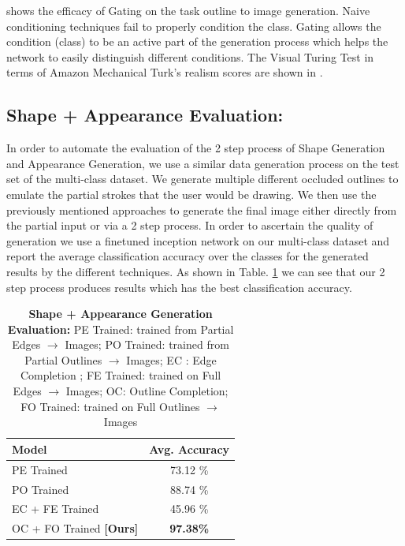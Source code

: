  shows the efficacy of Gating on the task outline to image generation. Naive conditioning techniques fail to properly condition the class. Gating allows the condition (class) to be an active part of the generation process which helps the network to easily distinguish different conditions. The Visual Turing Test in terms of Amazon Mechanical Turk's realism scores are shown in .

\subsection{Shape + Appearance Evaluation:}
In order to automate the evaluation of the 2 step process of Shape Generation and Appearance Generation, we use a similar data generation process on the test set of the multi-class dataset. We generate multiple different occluded outlines to emulate the partial strokes that the user would be drawing. We then use the previously mentioned approaches to generate the final image either directly from the partial input or via a 2 step process. In order to ascertain the quality of generation we use a finetuned inception network on our multi-class dataset and report the average classification accuracy over the classes for the generated results by the different techniques. As shown in Table. \ref{table:2step_eval} we can see that our 2 step process produces results which has the best classification accuracy.

\begin{table}[h]
    \centering
        \begin{tabular}{l c}
        \toprule
        \textbf{Model} & \textbf{Avg. Accuracy} \\ \midrule
        PE Trained & 73.12 \% \\
        PO Trained & 88.74 \% \\
        EC + FE Trained & 45.96 \% \\
        OC + FO Trained \textbf{[Ours]} & \textbf{97.38\%}  \\
        \bottomrule %
        \end{tabular}
    \caption{\label{table:2step_eval} {\textbf{Shape + Appearance Generation Evaluation:} PE Trained: trained from Partial Edges $\rightarrow$ Images; PO Trained: trained from Partial Outlines $\rightarrow$ Images; EC : Edge Completion ; FE Trained: trained on Full Edges $\rightarrow$ Images; OC: Outline Completion; FO Trained: trained on Full Outlines $\rightarrow$ Images } }
\end{table}

